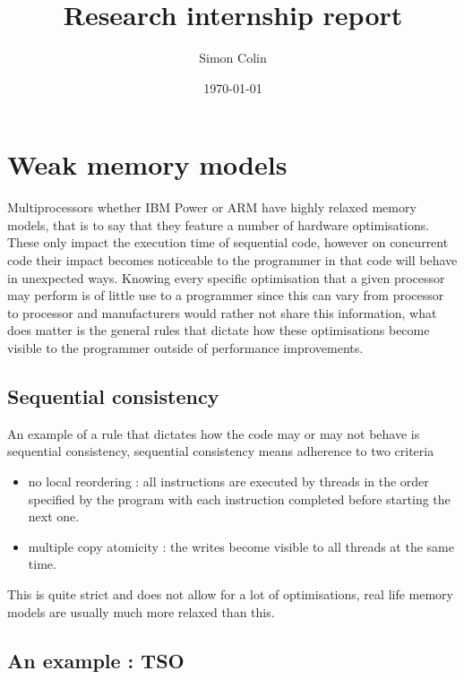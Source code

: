 \documentclass[a4,12pt]{article}
\title{Research internship report}
\author{Simon Colin}
\date{\today}
\begin{document}
\maketitle


\section{Weak memory models}

Multiprocessors whether IBM Power or ARM have highly relaxed memory models, that is to say that they feature a number of hardware optimisations. These only impact the execution time of sequential code, however on concurrent code their impact becomes noticeable to the programmer in that code will behave in unexpected ways. Knowing every specific optimisation that a given processor may perform is of little use to a programmer since this can vary from processor to processor and manufacturers would rather not share this information, what does matter is the general rules that dictate how these optimisations become visible to the programmer outside of performance improvements.

\subsection{Sequential consistency}

An example of a rule that dictates how the code may or may not behave is sequential consistency, sequential consistency means adherence to two criteria 
\begin{itemize}
\item no local reordering : all instructions are executed by threads in the order specified by the program with each instruction completed before starting the next one.
\item multiple copy atomicity : the writes become visible to all threads at the same time.
\end{itemize}
This is quite strict and does not allow for a lot of optimisations, real life memory models are usually much more relaxed than this.

\subsection{An example : TSO}
\end{document}
